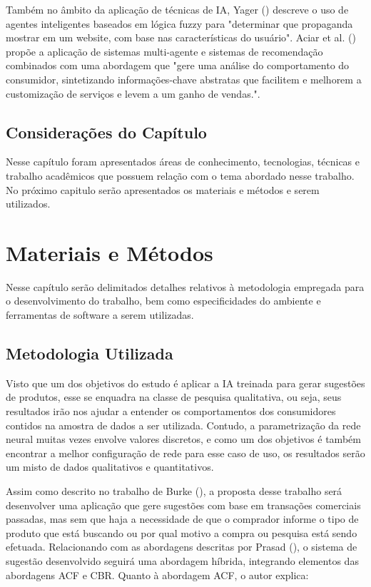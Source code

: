 Também no âmbito da aplicação de técnicas de IA, Yager (\citeyear{yager00}) descreve o uso de agentes inteligentes baseados em lógica fuzzy para "determinar que propaganda mostrar em um website, com base nas características do usuário". Aciar et al. (\citeyear{aciar07}) propõe a aplicação de sistemas multi-agente e sistemas de recomendação combinados com uma abordagem que "gere uma análise do comportamento do consumidor, sintetizando informações-chave abstratas que facilitem e melhorem a customização de serviços e levem a um ganho de vendas.".

\section{Considerações do Capítulo}
Nesse capítulo foram apresentados áreas de conhecimento, tecnologias, técnicas e trabalho acadêmicos que possuem relação com o tema abordado nesse trabalho. No próximo capitulo serão apresentados os materiais e métodos e serem utilizados.

\chapter{Materiais e Métodos}
\pagestyle{simple} 
\label{metodos}

Nesse capítulo serão delimitados detalhes relativos à metodologia empregada para o desenvolvimento do trabalho, bem como especificidades do ambiente e ferramentas de software a serem utilizadas.

\section{Metodologia Utilizada}

Visto que um dos objetivos do estudo é aplicar a IA treinada para gerar sugestões de produtos, esse se enquadra na classe de pesquisa qualitativa, ou seja, seus resultados irão nos ajudar a entender os comportamentos dos consumidores contidos na amostra de dados a ser utilizada. Contudo, a parametrização da rede neural muitas vezes envolve valores discretos, e como um dos objetivos é também encontrar a melhor configuração de rede para esse caso de uso, os resultados serão um misto de dados qualitativos e quantitativos.

Assim como descrito no trabalho de Burke (\citeyear{burke02}), a proposta desse trabalho será desenvolver uma aplicação que gere sugestões com base em transações comerciais passadas, mas sem que haja a necessidade de que o comprador informe o tipo de produto que está buscando ou por qual motivo a compra ou pesquisa está sendo efetuada. Relacionando com as abordagens descritas por Prasad (\citeyear{prasad03}), o sistema de sugestão desenvolvido seguirá uma abordagem híbrida, integrando elementos das abordagens ACF e CBR. Quanto à abordagem ACF, o autor explica:

